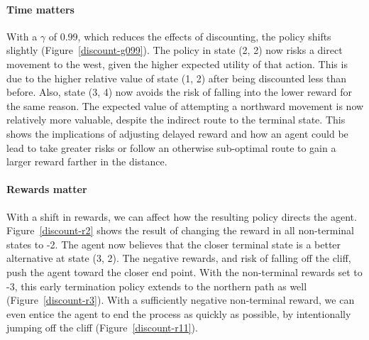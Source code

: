 \documentclass{sig-alternate}
\begin{document}
\paragraph{Time matters}

With a $\gamma$ of 0.99, which reduces the effects of discounting, the policy shifts slightly (Figure~\ref{discount-g099}). The policy in state (2, 2) now risks a direct movement to the west, given the higher expected utility of that action. This is due to the higher relative value of state (1, 2) after being discounted less than before. Also, state (3, 4) now avoids the risk of falling into the lower reward for the same reason. The expected value of attempting a northward movement is now relatively more valuable, despite the indirect route to the terminal state. This shows the implications of adjusting delayed reward and how an agent could be lead to take greater risks or follow an otherwise sub-optimal route to gain a larger reward farther in the distance.

\paragraph{Rewards matter}

With a shift in rewards, we can affect how the resulting policy directs the agent. Figure~\ref{discount-r2} shows the result of changing the reward in all non-terminal states to -2. The agent now believes that the closer terminal state is a better alternative at state (3, 2). The negative rewards, and risk of falling off the cliff, push the agent toward the closer end point. With the non-terminal rewards set to -3, this early termination policy extends to the northern path as well (Figure~\ref{discount-r3}). With a sufficiently negative non-terminal reward, we can even entice the agent to end the process as quickly as possible, by intentionally jumping off the cliff (Figure~\ref{discount-r11}).
\end{document}
